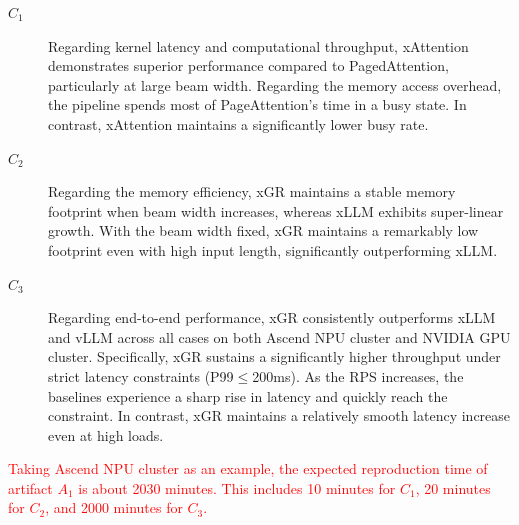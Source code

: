 \documentclass[nonacm,sigconf]{acmart}
\begin{document}
\begin{description}

\item[$C_1$] Regarding kernel latency and computational throughput, xAttention demonstrates superior performance compared to PagedAttention, particularly at large beam width. Regarding the memory access overhead, the pipeline spends most of PageAttention's time in a busy state. In contrast, xAttention maintains a significantly lower busy rate.

\item[$C_2$] Regarding the memory efficiency, xGR maintains a stable memory footprint when beam width increases, whereas xLLM exhibits super-linear growth. With the beam width fixed, xGR maintains a remarkably low footprint even with high input length, significantly outperforming xLLM.

\item[$C_3$] Regarding end-to-end performance, xGR consistently outperforms xLLM and vLLM across all cases on both Ascend NPU cluster and NVIDIA GPU cluster. Specifically, xGR sustains a significantly higher throughput under strict latency constraints (P99$\leq$200ms). As the RPS increases, the baselines experience a sharp rise in latency and quickly reach the constraint. In contrast, xGR maintains a relatively smooth latency increase even at high loads. 


\end{description}

%

\arttime


\textcolor{red}{Taking  Ascend NPU cluster as an example, the expected reproduction time of artifact $A_1$ is about 2030 minutes. This includes 10 minutes for $C_1$, 20 minutes for $C_2$, and 2000 minutes for $C_3$.}
\end{document}
